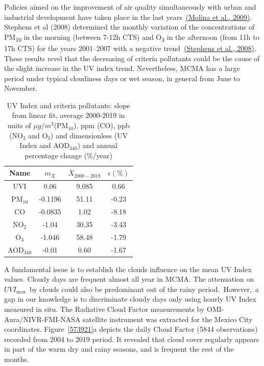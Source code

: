 \documentclass[10pt]{article}
\begin{document}
Policies aimed on the improvement of air quality simultaneously with
urban and industrial development have taken place in the last
years~\hyperref[csl:65]{(Molina et al., 2009)}. Stephens et al (2008) determined the monthly
variation of the concentrations of PM\textsubscript{10} in the morning
(between 7-12h CTS) and O\textsubscript{3} in the afternoon (from 11h to
17h CTS) for the years 2001--2007 with a negative
trend~\hyperref[csl:66]{(Stephens et al., 2008)}. These results revel that the decreasing of
criteria pollutants could be the cause of the slight increase in the UV
index trend. Nevertheless, MCMA has a large period under typical
cloudiness days or wet season, in general from June to November.
\begin{table}[H]
\centering
\begin{tabular}{cccc} \hline
Name &$m_X$ & $\overline{X}_{2000-2019}$ & $\epsilon(\%)$\\ \hline
UVI &0.06 &9.085 &0.66 \\
PM$_{10}$ &-0.1196 & 51.11& -0.23\\ 
CO &-0.0835 &1.02 &-8.18\\ 
NO$_2$ &-1.04 & 30.35 &-3.43\\ 
O$_3$ &-1.046 & 58.48 &-1.79\\ 
AOD$_{340}$ &-0.01 &0.60 &-1.67\\
\hline
\end{tabular}
\caption{{UV Index and criteria pollutants: slope from linear fit, average 2000-2019 in units of $\mu g/m^3$(PM$_{10}$), ppm (CO), ppb (NO$_2$ and O$_3$) and dimensionless (UV Index and AOD$_{340}$) and annual percentage change (\%/year)}}
\end{table}

A fundamental issue is to establish the clouds influence on the mean UV
Index values. C{loudy days are frequent almost all year in MCMA. The
attenuation on~\(UVI_{\max}\)~by clouds could also be predominant
out of the rainy period.~However,~a gap in our knowledge is to
discriminate cloudy days only using hourly UV Index measured in situ.
T}he Radiative Cloud Factor measurements by OMI-Aura/NIVR-FMI-NASA
satellite instrument was extracted for the Mexico City coordinates.
Figure~{\ref{573921}}a depicts the daily Cloud Factor
(5844 observations) recorded from 2004 to 2019 period. It revealed that
cloud cover regularly appears in part of the warm dry and rainy seasons,
and is frequent the rest of the months.~
\end{document}
